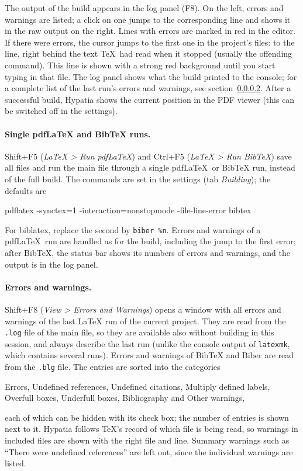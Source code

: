 \documentclass[11pt]{article}
\newcommand{\key}[1]{\textsf{#1}}
\newcommand{\menu}[1]{\textsf{\textit{#1}}}
\begin{document}
    The output of the build appears in the log panel (\key{F8}). On the left, errors and warnings are listed; a click on one jumps to the corresponding line and shows it in the raw output on the right. Lines with errors are marked in red in the editor. If there were errors, the cursor jumps to the first one in the project's files: to the line, right behind the text \TeX\ had read when it stopped (usually the offending command). This line is shown with a strong red background until you start typing in that file. The log panel shows what the build printed to the console; for a complete list of the last run's errors and warnings, see section~\ref{sec:problems}. After a successful build, Hypatia shows the current position in the PDF viewer (this can be switched off in the settings).

    \paragraph{Single pdfLaTeX and BibTeX runs.}     \key{Shift+F5} (\menu{LaTeX > Run pdfLaTeX}) and \key{Ctrl+F5} (\menu{LaTeX > Run BibTeX}) save all files and run the main file through a single pdf\LaTeX\ or BibTeX run, instead of the full build. The commands are set in the settings (tab \emph{Building}); the defaults are
    \begin{Code}
pdflatex -synctex=1 -interaction=nonstopmode -file-line-error %
bibtex %
    \end{Code}
    For biblatex, replace the second by \verb+biber %n+. Errors and warnings of a pdf\LaTeX\ run are handled as for the build, including the jump to the first error; after BibTeX, the status bar shows its numbers of errors and warnings, and the output is in the log panel.

    \paragraph{Errors and warnings.}\label{sec:problems}     \key{Shift+F8} (\menu{View > Errors and Warnings}) opens a window with all errors and warnings of the last LaTeX run of the current project. They are read from the \verb+.log+ file of the main file, so they are available also without building in this session, and always describe the last run (unlike the console output of \verb+latexmk+, which contains several runs). Errors and warnings of BibTeX and Biber are read from the \verb+.blg+ file. The entries are sorted into the categories
    \begin{center}
        Errors, Undefined references, Undefined citations, Multiply defined labels,\\ Overfull boxes, Underfull boxes, Bibliography and Other warnings,
    \end{center}
    each of which can be hidden with its check box; the number of entries is shown next to it. Hypatia follows TeX's record of which file is being read, so warnings in included files are shown with the right file and line. Summary warnings such as ``There were undefined references'' are left out, since the individual warnings are listed.
\end{document}
